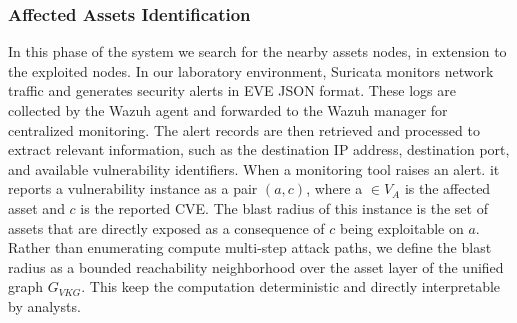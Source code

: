 \documentclass[conference]{IEEEtran}
\begin{document}
\subsubsection{\textbf{Affected Assets Identification}} In this phase of the system we search for the nearby assets nodes, in extension to the exploited nodes. In our laboratory environment, Suricata monitors network traffic and generates security alerts in EVE JSON format. These logs are collected by the Wazuh agent and forwarded to the Wazuh manager for centralized monitoring. The alert records are then retrieved and processed to extract relevant information, such as the destination IP address, destination port, and available vulnerability identifiers. When a monitoring tool raises an alert. it reports a vulnerability instance as a pair $(a, c)$, where a $\in V_A$ is the affected asset and $c$ is the reported CVE. The blast radius of this instance is the set of assets that are directly exposed as a consequence of $c$ being exploitable on $a$. Rather than enumerating compute multi-step attack paths, we define the blast radius as a bounded reachability neighborhood over the asset layer of the unified graph $G_{VKG}$. This keep the computation deterministic and directly interpretable by analysts.
\end{document}
